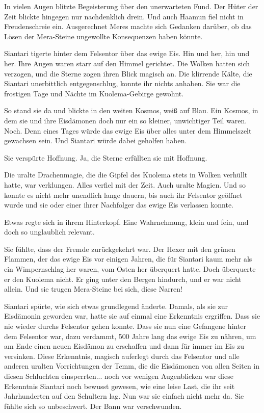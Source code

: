 In vielen Augen blitzte Begeisterung über den unerwarteten Fund. Der Hüter der Zeit blickte hingegen nur nachdenklich drein. Und auch Haamun fiel nicht in Freudenschreie ein. Ausgerechnet Meres machte sich Gedanken darüber, ob das Lösen der Mera-Steine ungewollte Konsequenzen haben könnte.\bigskip







Siantari tigerte hinter dem Felsentor über das ewige Eis. Hin und her, hin und her. Ihre Augen waren starr auf den Himmel gerichtet. Die Wolken hatten sich verzogen, und die Sterne zogen ihren Blick magisch an. Die klirrende Kälte, die Siantari unerbittlich entgegenschlug, konnte ihr nichts anhaben. Sie war die frostigen Tage und Nächte im Kuolema-Gebirge gewohnt.

So stand sie da und blickte in den weiten Kosmos, weiß auf Blau. Ein Kosmos, in dem sie und ihre Eisdämonen doch nur ein so kleiner, unwichtiger Teil waren. Noch. Denn eines Tages würde das ewige Eis über alles unter dem Himmelszelt gewachsen sein. Und Siantari würde dabei geholfen haben.

Sie verspürte Hoffnung. Ja, die Sterne erfüllten sie mit Hoffnung.

Die uralte Drachenmagie, die die Gipfel des Kuolema stets in Wolken verhüllt hatte, war verklungen. Alles verfiel mit der Zeit. Auch uralte Magien. Und so konnte es nicht mehr unendlich lange dauern, bis auch ihr Felsentor geöffnet wurde und sie oder einer ihrer Nachfolger das ewige Eis verlassen konnte.

Etwas regte sich in ihrem Hinterkopf. Eine Wahrnehmung, klein und fein, und doch so unglaublich relevant.

Sie fühlte, dass der Fremde zurückgekehrt war. Der Hexer mit den grünen Flammen, der das ewige Eis vor einigen Jahren, die für Siantari kaum mehr als ein Wimpernschlag her waren, vom Osten her überquert hatte. Doch überquerte er den Kuolema nicht. Er ging unter den Bergen hindurch, und er war nicht allein. Und sie trugen Mera-Steine bei sich, diese Narren!

Siantari spürte, wie sich etwas grundlegend änderte. Damals, als sie zur Eisdämonin geworden war, hatte sie auf einmal eine Erkenntnis ergriffen. Dass sie nie wieder durchs Felsentor gehen konnte. Dass sie nun eine Gefangene hinter dem Felsentor war, dazu verdammt, 500 Jahre lang das ewige Eis zu nähren, um am Ende einen neuen Eisdämon zu erschaffen und dann für immer im Eis zu versinken. Diese Erkenntnis, magisch auferlegt durch das Felsentor und alle anderen uralten Vorrichtungen der Temm, die die Eisdämonen von allen Seiten in diesen Schluchten einsperrten... noch vor wenigen Augenblicken war diese Erkenntnis Siantari noch bewusst gewesen, wie eine leise Last, die ihr seit Jahrhunderten auf den Schultern lag. Nun war sie einfach nicht mehr da. Sie fühlte sich so unbeschwert. Der Bann war verschwunden.

